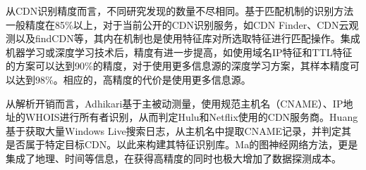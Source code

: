 

从CDN识别精度而言，不同研究发现的数量不尽相同。基于匹配机制的识别方法一般精度在85\%以上，对于当前公开的CDN识别服务，如CDN Finder、CDN云观测以及findCDN等，其内在机制也是使用特征库对所选取特征进行匹配操作。集成机器学习或深度学习技术后，精度有进一步提高，如使用域名IP特征和TTL特征的方案可以达到90\%的精度，对于使用更多信息源的深度学习方案\cite{Ma2021}，其样本精度可以达到98\%。相应的，高精度的代价是使用更多信息源。

从解析开销而言，Adhikari\cite{Adhikari2014}基于主被动测量，使用规范主机名（CNAME）、IP地址的WHOIS进行所有者识别，从而判定Hulu和Netflix使用的CDN服务商。Huang\cite{Huang2008}基于获取大量Windows Live搜索日志，从主机名中提取CNAME记录，并判定其是否属于特定目标CDN。以此来构建其特征识别库。Ma\cite{Ma2021}的图神经网络方法，更是集成了地理、时间等信息，在获得高精度的同时也极大增加了数据探测成本。 


